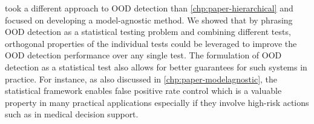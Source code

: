
\vspace{1em}
\textbf{} took a different approach to OOD detection than \cref{chp:paper-hierarchical} and focused on developing a model-agnostic method. 
We showed that by phrasing OOD detection as a statistical testing problem and combining different tests, orthogonal properties of the individual tests could be leveraged to improve the OOD detection performance over any single test.
%
The formulation of OOD detection as a statistical test also allows for better guarantees for such systems in practice. For instance, as also discussed in \cref{chp:paper-modelagnostic}, the statistical framework enables false positive rate control which is a valuable property in many practical applications especially if they involve high-risk actions such as in medical decision support. 





